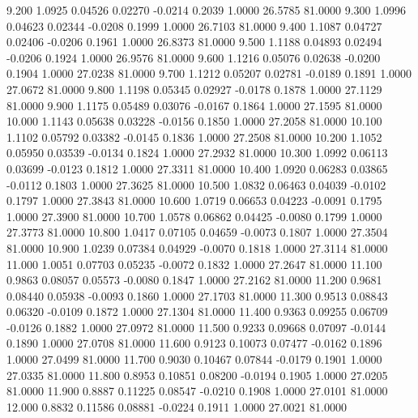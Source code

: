    9.200   1.0925   0.04526   0.02270  -0.0214   0.2039   1.0000  26.5785  81.0000
   9.300   1.0996   0.04623   0.02344  -0.0208   0.1999   1.0000  26.7103  81.0000
   9.400   1.1087   0.04727   0.02406  -0.0206   0.1961   1.0000  26.8373  81.0000
   9.500   1.1188   0.04893   0.02494  -0.0206   0.1924   1.0000  26.9576  81.0000
   9.600   1.1216   0.05076   0.02638  -0.0200   0.1904   1.0000  27.0238  81.0000
   9.700   1.1212   0.05207   0.02781  -0.0189   0.1891   1.0000  27.0672  81.0000
   9.800   1.1198   0.05345   0.02927  -0.0178   0.1878   1.0000  27.1129  81.0000
   9.900   1.1175   0.05489   0.03076  -0.0167   0.1864   1.0000  27.1595  81.0000
  10.000   1.1143   0.05638   0.03228  -0.0156   0.1850   1.0000  27.2058  81.0000
  10.100   1.1102   0.05792   0.03382  -0.0145   0.1836   1.0000  27.2508  81.0000
  10.200   1.1052   0.05950   0.03539  -0.0134   0.1824   1.0000  27.2932  81.0000
  10.300   1.0992   0.06113   0.03699  -0.0123   0.1812   1.0000  27.3311  81.0000
  10.400   1.0920   0.06283   0.03865  -0.0112   0.1803   1.0000  27.3625  81.0000
  10.500   1.0832   0.06463   0.04039  -0.0102   0.1797   1.0000  27.3843  81.0000
  10.600   1.0719   0.06653   0.04223  -0.0091   0.1795   1.0000  27.3900  81.0000
  10.700   1.0578   0.06862   0.04425  -0.0080   0.1799   1.0000  27.3773  81.0000
  10.800   1.0417   0.07105   0.04659  -0.0073   0.1807   1.0000  27.3504  81.0000
  10.900   1.0239   0.07384   0.04929  -0.0070   0.1818   1.0000  27.3114  81.0000
  11.000   1.0051   0.07703   0.05235  -0.0072   0.1832   1.0000  27.2647  81.0000
  11.100   0.9863   0.08057   0.05573  -0.0080   0.1847   1.0000  27.2162  81.0000
  11.200   0.9681   0.08440   0.05938  -0.0093   0.1860   1.0000  27.1703  81.0000
  11.300   0.9513   0.08843   0.06320  -0.0109   0.1872   1.0000  27.1304  81.0000
  11.400   0.9363   0.09255   0.06709  -0.0126   0.1882   1.0000  27.0972  81.0000
  11.500   0.9233   0.09668   0.07097  -0.0144   0.1890   1.0000  27.0708  81.0000
  11.600   0.9123   0.10073   0.07477  -0.0162   0.1896   1.0000  27.0499  81.0000
  11.700   0.9030   0.10467   0.07844  -0.0179   0.1901   1.0000  27.0335  81.0000
  11.800   0.8953   0.10851   0.08200  -0.0194   0.1905   1.0000  27.0205  81.0000
  11.900   0.8887   0.11225   0.08547  -0.0210   0.1908   1.0000  27.0101  81.0000
  12.000   0.8832   0.11586   0.08881  -0.0224   0.1911   1.0000  27.0021  81.0000
